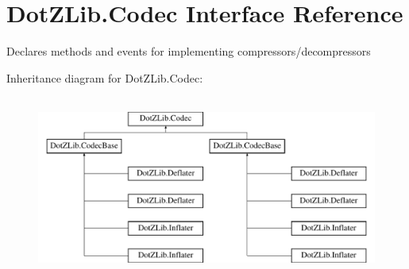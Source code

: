 \hypertarget{interface_dot_z_lib_1_1_codec}{}\section{Dot\+Z\+Lib.\+Codec Interface Reference}
\label{interface_dot_z_lib_1_1_codec}


Declares methods and events for implementing compressors/decompressors  


Inheritance diagram for Dot\+Z\+Lib.\+Codec\+:\begin{figure}[H]
\begin{center}
\leavevmode
\includegraphics[height=6.000000cm]{interface_dot_z_lib_1_1_codec}
\end{center}
\end{figure}

